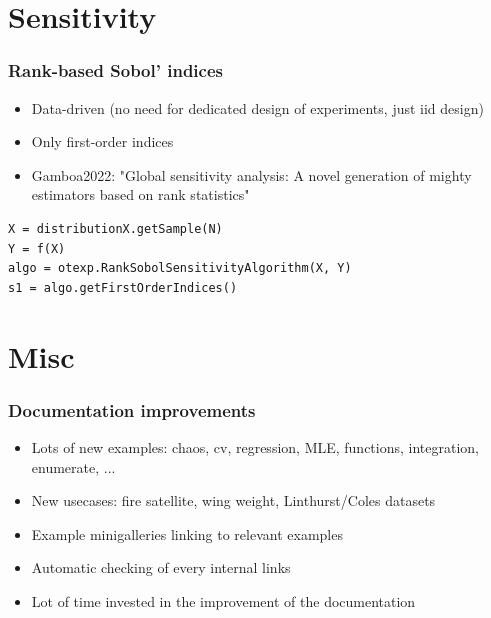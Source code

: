 \documentclass[aspectratio=169]{beamer}
\begin{document}

\section{Sensitivity}

\begin{frame}[containsverbatim]
\frametitle{Rank-based Sobol' indices}

\begin{itemize}
\item Data-driven (no need for dedicated design of experiments, just iid design)
\item Only first-order indices
\item Gamboa2022: "Global sensitivity analysis: A novel generation of mighty estimators based on rank statistics"
\end{itemize}


\begin{small}
\begin{lstlisting}
X = distributionX.getSample(N)
Y = f(X)
algo = otexp.RankSobolSensitivityAlgorithm(X, Y)
s1 = algo.getFirstOrderIndices()
\end{lstlisting}
\end{small}

\end{frame}


\section{Misc}

\begin{frame}
\frametitle{Documentation improvements}
\begin{itemize}
\item Lots of new examples: chaos, cv, regression, MLE, functions, integration, enumerate, ...
\item New usecases: fire satellite, wing weight, Linthurst/Coles datasets
\end{itemize}


\begin{itemize}
\item Example minigalleries linking to relevant examples
\item Automatic checking of every internal links
\item Lot of time invested in the improvement of the documentation
\end{itemize}
\end{frame}
\end{document}
